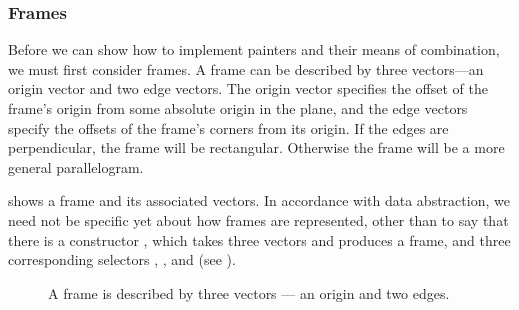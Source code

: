 \subsubsection*{Frames}

Before we can show how to implement painters and their means of combination, we must first consider frames.
A frame can be described by three vectors---an origin vector and two edge vectors.
The origin vector specifies the offset of the frame’s origin from some absolute origin in the plane, and the edge vectors specify the offsets of the frame’s corners from its origin.
If the edges are perpendicular, the frame will be rectangular.
Otherwise the frame will be a more general parallelogram.

 shows a frame and its associated vectors.
In accordance with data abstraction, we need not be specific yet about how frames are represented, other than to say that there is a constructor , which takes three vectors and produces a frame, and three corresponding selectors , , and  (see ).

\begin{figure}[tb]
	\centering
	
	\caption{
		A frame is described by three vectors --- an origin and two edges.
	}
	\label{Figure 2.15}
\end{figure}

